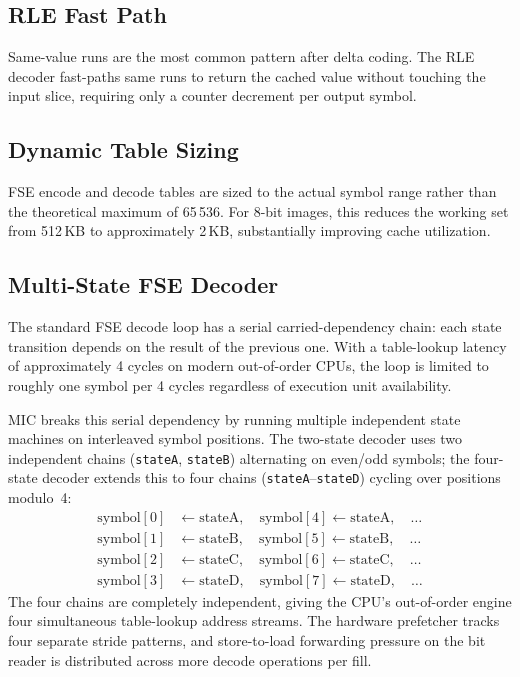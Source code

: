 \documentclass[11pt,twocolumn]{article}
\begin{document}
\subsection{RLE Fast Path}

Same-value runs are the most common pattern after delta coding.
The RLE decoder fast-paths same runs to return the cached value without touching the input slice, requiring only a counter decrement per output symbol.

\subsection{Dynamic Table Sizing}

FSE encode and decode tables are sized to the actual symbol range rather than the theoretical maximum of 65\,536.
For 8-bit images, this reduces the working set from 512\,KB to approximately 2\,KB, substantially improving cache utilization.

\subsection{Multi-State FSE Decoder}
\label{sec:twostate}

The standard FSE decode loop has a serial carried-dependency chain: each state transition depends on the result of the previous one.
With a table-lookup latency of approximately 4 cycles on modern out-of-order CPUs, the loop is limited to roughly one symbol per 4 cycles regardless of execution unit availability.

MIC breaks this serial dependency by running multiple independent state machines on interleaved symbol positions.
The two-state decoder uses two independent chains (\texttt{stateA}, \texttt{stateB}) alternating on even/odd symbols; the four-state decoder extends this to four chains (\texttt{stateA}--\texttt{stateD}) cycling over positions modulo~4:
\begin{align*}
    \text{symbol}[0] &\leftarrow \text{stateA}, \quad \text{symbol}[4] \leftarrow \text{stateA}, \quad \ldots \\
    \text{symbol}[1] &\leftarrow \text{stateB}, \quad \text{symbol}[5] \leftarrow \text{stateB}, \quad \ldots \\
    \text{symbol}[2] &\leftarrow \text{stateC}, \quad \text{symbol}[6] \leftarrow \text{stateC}, \quad \ldots \\
    \text{symbol}[3] &\leftarrow \text{stateD}, \quad \text{symbol}[7] \leftarrow \text{stateD}, \quad \ldots
\end{align*}
The four chains are completely independent, giving the CPU's out-of-order engine four simultaneous table-lookup address streams.
The hardware prefetcher tracks four separate stride patterns, and store-to-load forwarding pressure on the bit reader is distributed across more decode operations per fill.
\end{document}
